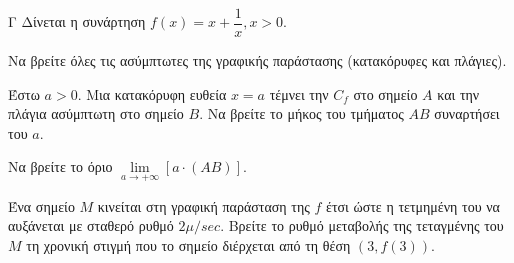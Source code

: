 \begin{thema}{Γ}
Δίνεται η συνάρτηση $f(x) = x + \dfrac{1}{x}, x > 0$.
\begin{erwthma}
  \item Να βρείτε όλες τις ασύμπτωτες της γραφικής παράστασης (κατακόρυφες και πλάγιες).
  \item Έστω $a > 0$. Μια κατακόρυφη ευθεία $x = a$ τέμνει την $C_f$ στο σημείο $A$ και την πλάγια ασύμπτωτη στο σημείο $B$. Να βρείτε το μήκος του τμήματος $AB$ συναρτήσει του $a$.
  \item Να βρείτε το όριο $\lim\limits_{a \to +\infty} [a \cdot (AB)]$.
  \item Ένα σημείο $M$ κινείται στη γραφική παράσταση της $f$ έτσι ώστε η τετμημένη του να αυξάνεται με σταθερό ρυθμό $2\mu/\si{sec}$. Βρείτε το ρυθμό μεταβολής της τεταγμένης του $M$ τη χρονική στιγμή που το σημείο διέρχεται από τη θέση $(3,f(3))$.
\end{erwthma}
\end{thema}
